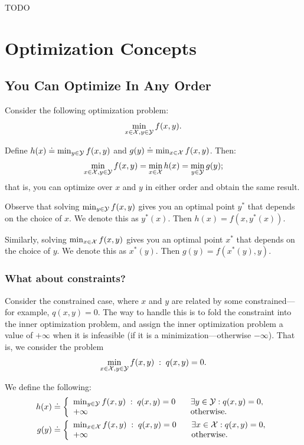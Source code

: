 \documentclass[12pt]{article}
\begin{document}
TODO

\pagebreak

\section{Optimization Concepts}

\subsection{You Can Optimize In Any Order}

Consider the following optimization problem:
%
\begin{equation*}
\min_{x\in{\mathcal X}, y\in{\mathcal Y}} f(x,y).
\end{equation*}

Define $h(x) \doteq \min_{y \in{\mathcal Y}} f(x,y)$ and $g(y) \doteq \min_{x \in {\mathcal X}} f(x,y)$. Then:
%
\begin{equation*}
\min_{x\in{\mathcal X}, y\in{\mathcal Y}} f(x,y) = \min_{x \in {\mathcal X}} h(x) = \min_{y \in {\mathcal Y}} g(y);
\end{equation*}
%
that is, you can optimize over $x$ and $y$ in either order and obtain the same result.

Observe that solving $\min_{y \in{\mathcal Y}} f(x,y)$ gives you an optimal point $y^*$ that depends on the choice of $x$. We denote this as $y^*(x)$. Then $h(x) = f(x, y^*(x))$. 

Similarly, solving $\min_{x \in{\mathcal X}} f(x,y)$ gives you an optimal point $x^*$ that depends on the choice of $y$. We denote this as $x^*(y)$. Then $g(y) = f(x^*(y),y)$. 

\subsubsection{What about constraints?}

Consider the constrained case, where $x$ and $y$ are related by some constrained---for example, $q(x,y) = 0$. The way to handle this is to fold the constraint into the inner optimization problem, and assign the inner optimization problem a value of $+ \infty$ when it is infeasible (if it is a minimization---otherwise $- \infty$). That is, we consider the problem
%
\begin{equation*}
\min_{x \in {\mathcal X}, y \in {\mathcal Y}} f(x,y) \; : \; q(x,y) = 0.
\end{equation*}

We define the following:
%
\begin{align*}
h(x) &\doteq \left\{ \begin{array}{ll}
\min_{y \in {\mathcal Y}} f(x,y) \; : \; q(x,y) = 0 \;\;\;& \exists y \in {\mathcal Y} : q(x,y) = 0, \\
+\infty & \text{otherwise.}
\end{array}\right. \\
g(y) &\doteq \left\{ \begin{array}{ll}
\min_{x \in {\mathcal X}} f(x,y) \; : \; q(x,y) = 0 \;\;\;& \exists x \in {\mathcal X} : q(x,y) = 0, \\
+\infty & \text{otherwise.}
\end{array}\right.
\end{align*}
\end{document}
